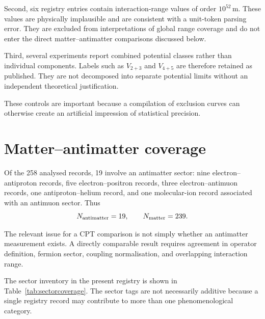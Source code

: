 \documentclass[aps,prd,reprint,superscriptaddress,nofootinbib]{revtex4-2}
\begin{document}
	Second, six registry entries contain interaction-range values of order
	$10^{52}\,\mathrm{m}$. These values are physically implausible and are
	consistent with a unit-token parsing error. They are excluded from
	interpretations of global range coverage and do not enter the direct
	matter--antimatter comparisons discussed below.
	
	Third, several experiments report combined potential classes rather
	than individual components. Labels such as $V_{2+3}$ and $V_{4+5}$ are
	therefore retained as published. They are not decomposed into separate
	potential limits without an independent theoretical justification.
	
	These controls are important because a compilation of exclusion curves
	can otherwise create an artificial impression of statistical precision.
	
	\section{Matter--antimatter coverage}
	
	Of the 258 analysed records, 19 involve an antimatter sector:
	nine electron--antiproton records, five electron--positron records,
	three electron--antimuon records, one antiproton--helium record, and
	one molecular-ion record associated with an antimuon sector. Thus
	\begin{equation}
		N_{\rm antimatter}=19,
		\qquad
		N_{\rm matter}=239.
		\label{eq:mattercounts}
	\end{equation}
	
	The relevant issue for a CPT comparison is not simply whether an
	antimatter measurement exists. A directly comparable result requires
	agreement in operator definition, fermion sector, coupling
	normalisation, and overlapping interaction range.
	
	The sector inventory in the present registry is shown in
	Table~\ref{tab:sectorcoverage}. The sector tags are not necessarily
	additive because a single registry record may contribute to more than
	one phenomenological category.
	
\end{document}
